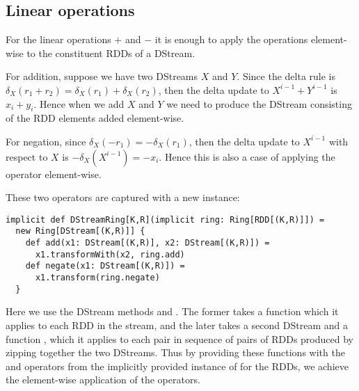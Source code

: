 \subsection{Linear operations}
For the linear operations $+$ and $-$ it is enough to apply the operations element-wise to the constituent RDDs of a DStream.

For addition, suppose we have two DStreams $X$ and $Y$. Since the delta rule is $\delta_X(r_1 + r_2) = \delta_X(r_1) + \delta_X(r_2)$, then the delta update to $X^{i-1} + Y^{i-1}$ is $x_i + y_i$. Hence when we add $X$ and $Y$ we need to produce the DStream consisting of the RDD elements added element-wise.

For negation, since $\delta_X(-r_1) = -\delta_X(r_1)$, then the delta update to $X^{i-1}$ with respect to $X$ is $-\delta_X(X^{i-1}) = -x_i$. Hence this is also a case of applying the operator element-wise.

These two operators are captured with a new  instance:
\vs\begin{lstlisting}
implicit def DStreamRing[K,R](implicit ring: Ring[RDD[(K,R)]]) =
  new Ring[DStream[(K,R)]] {  
    def add(x1: DStream[(K,R)], x2: DStream[(K,R)]) =
      x1.transformWith(x2, ring.add)
    def negate(x1: DStream[(K,R)]) =
      x1.transform(ring.negate)
  }
\end{lstlisting}\vs
Here we use the DStream methods  and . The former takes a function  which it applies to each RDD in the stream, and the later takes a second DStream and a function , which it applies to each pair in sequence of pairs of RDDs produced by zipping together the two DStreams. Thus by providing these functions with the  and  operators from the implicitly provided instance of   for the RDDs, we achieve the element-wise application of the operators.
